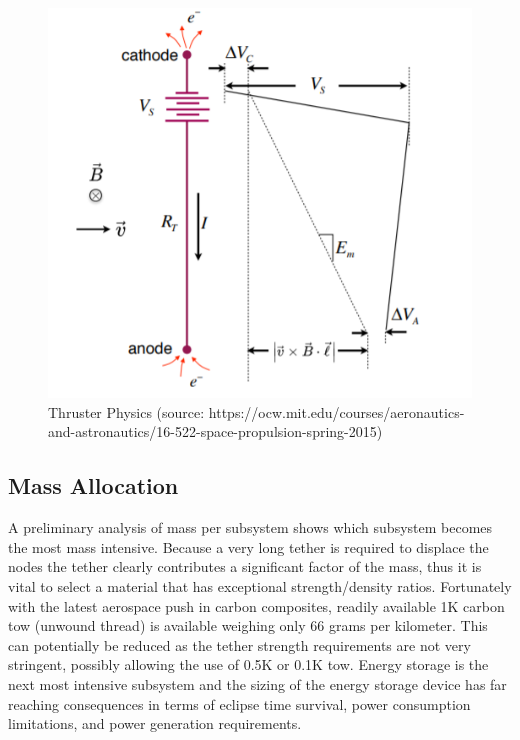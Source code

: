 \documentclass{article}
\begin{document}
\begin{figure}[H]
  \centering
    \includegraphics[width=.8\linewidth]{figures/tether_thruster}
    \caption{Thruster Physics (source: https://ocw.mit.edu/courses/aeronautics-and-astronautics/16-522-space-propulsion-spring-2015) }
\end{figure}

\subsection{Mass Allocation}
A preliminary analysis of mass per subsystem shows which subsystem becomes the most mass intensive. Because a very long tether is required to displace the nodes the tether clearly contributes a significant factor of the mass, thus it is vital to select a material that has exceptional strength/density ratios. Fortunately with the latest aerospace push in carbon composites, readily available 1K carbon tow (unwound thread) is available weighing only 66 grams per kilometer. This can potentially be reduced as the tether strength requirements are not very stringent, possibly allowing the use of 0.5K or 0.1K tow. 
Energy storage is the next most intensive subsystem and the sizing of the energy storage device has far reaching consequences in terms of eclipse time survival, power consumption limitations, and power generation requirements. 
\end{document}
